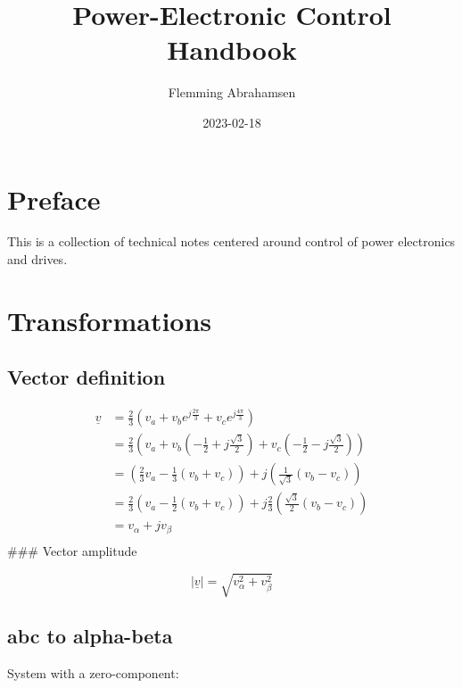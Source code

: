\documentclass[]{book}
\title{Power-Electronic Control Handbook}
\author{Flemming Abrahamsen}
\date{2023-02-18}
\begin{document}
\maketitle

{
\setcounter{tocdepth}{1}
\tableofcontents
}
\hypertarget{preface}{%
\chapter{Preface}\label{preface}}

This is a collection of technical notes centered around control of power electronics and drives.

\hypertarget{transformations}{%
\chapter{Transformations}\label{transformations}}

\hypertarget{vector-definition}{%
\section{Vector definition}\label{vector-definition}}

\[
\begin{aligned}
\underline{v} 
& = \frac{2}{3} \left( v_a + v_b e^{j \frac{2 \pi}{3}}+ v_c e^{j \frac{4 \pi}{3}} \right)\\
& = \frac{2}{3} \left( v_a + v_b (- \frac{1}{2}+j\frac{\sqrt{3}}{2}) + v_c (- \frac{1}{2}-j\frac{\sqrt{3}}{2}) \right)\\
& = \left(\frac{2}{3} v_a - \frac{1}{3}  (v_b+v_c) \right) + j \left( \frac{1}{\sqrt{3}} (v_b-v_c) \right)   \\
& = \frac{2}{3} \left( v_a - \frac{1}{2}  (v_b+v_c) \right) + j \frac{2}{3} \left( \frac{\sqrt{3}}{2} (v_b-v_c) \right)   \\
& = v_\alpha + j v_\beta   \\
\end{aligned}
\label{eq:trans1}
\]
\#\#\# Vector amplitude

\[
|\underline{v}| = \sqrt{v_\alpha^2 +  v_\beta^2}
\label{eq:trans1a}
\]

\hypertarget{abc-to-alpha-beta}{%
\section{abc to alpha-beta}\label{abc-to-alpha-beta}}

System with a zero-component:
\end{document}

